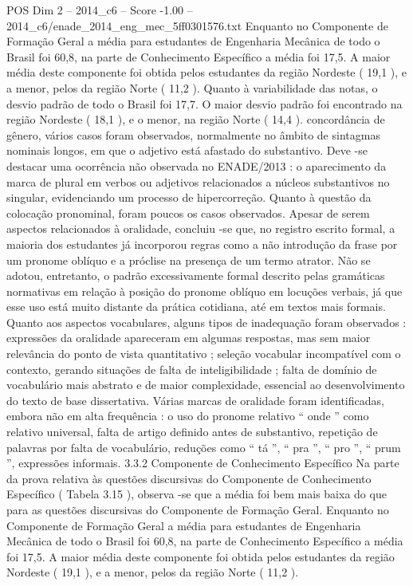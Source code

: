 \begin{textsample}{POS Dim 2 – 2014\_c6 – Score -1.00 – 2014\_c6/enade\_2014\_eng\_mec\_5ff0301576.txt}
Enquanto no Componente de Formação Geral a média para estudantes de Engenharia Mecânica de todo o Brasil foi 60,8, na parte de Conhecimento Específico a média foi 17,5.
A maior média deste componente foi obtida pelos estudantes da região Nordeste ( 19,1 ), e a menor, pelos da região Norte ( 11,2 ).
Quanto à variabilidade das notas, o desvio padrão de todo o Brasil foi 17,7.
O maior desvio padrão foi encontrado na região Nordeste ( 18,1 ), e o menor, na região Norte ( 14,4 ). concordância de gênero, vários casos foram observados, normalmente no âmbito de sintagmas nominais longos, em que o adjetivo está afastado do substantivo.
Deve -se destacar uma ocorrência não observada no ENADE/2013 : o aparecimento da marca de plural em verbos ou adjetivos relacionados a núcleos substantivos no singular, evidenciando um processo de hipercorreção.
Quanto à questão da colocação pronominal, foram poucos os casos observados.
Apesar de serem aspectos relacionados à oralidade, concluiu -se que, no registro escrito formal, a maioria dos estudantes já incorporou regras como a não introdução da frase por um pronome oblíquo e a próclise na presença de um termo atrator.
Não se adotou, entretanto, o padrão excessivamente formal descrito pelas gramáticas normativas em relação à posição do pronome oblíquo em locuções verbais, já que esse uso está muito distante da prática cotidiana, até em textos mais formais.
Quanto aos aspectos vocabulares, alguns tipos de inadequação foram observados : expressões da oralidade apareceram em algumas respostas, mas sem maior relevância do ponto de vista quantitativo ; seleção vocabular incompatível com o contexto, gerando situações de falta de inteligibilidade ; falta de domínio de vocabulário mais abstrato e de maior complexidade, essencial ao desenvolvimento do texto de base dissertativa.
Várias marcas de oralidade foram identificadas, embora não em alta frequência : o uso do pronome relativo “ onde ” como relativo universal, falta de artigo definido antes de substantivo, repetição de palavras por falta de vocabulário, reduções como “ tá ”, “ pra ”, “ pro ”, “ prum ”, expressões informais. 3.3.2 Componente de Conhecimento Específico Na parte da prova relativa às questões discursivas do Componente de Conhecimento Específico ( Tabela 3.15 ), observa -se que a média foi bem mais baixa do que para as questões discursivas do Componente de Formação Geral.
Enquanto no Componente de Formação Geral a média para estudantes de Engenharia Mecânica de todo o Brasil foi 60,8, na parte de Conhecimento Específico a média foi 17,5.
A maior média deste componente foi obtida pelos estudantes da região Nordeste ( 19,1 ), e a menor, pelos da região Norte ( 11,2 ).

\end{textsample}
